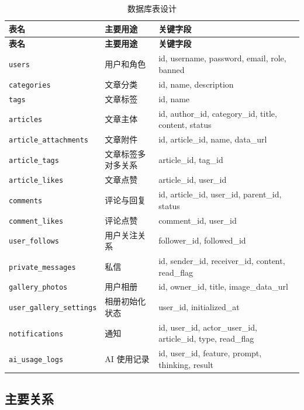 \documentclass[UTF8,a4paper,12pt]{ctexart}
\begin{document}
\begingroup
\small
\setlength{\tabcolsep}{4pt}
\begin{longtable}{p{4.5cm}p{3.1cm}p{6.3cm}}
\caption{数据库表设计}\\
\toprule
\rowcolor{tablehead}\textbf{表名} & \textbf{主要用途} & \textbf{关键字段}\\
\midrule
\endfirsthead
\toprule
\rowcolor{tablehead}\textbf{表名} & \textbf{主要用途} & \textbf{关键字段}\\
\midrule
\endhead
\texttt{users} & 用户和角色 & id, username, password, email, role, banned\\
\texttt{categories} & 文章分类 & id, name, description\\
\texttt{tags} & 文章标签 & id, name\\
\texttt{articles} & 文章主体 & id, author\_id, category\_id, title, content, status\\
\texttt{article\_attachments} & 文章附件 & id, article\_id, name, data\_url\\
\texttt{article\_tags} & 文章标签多对多关系 & article\_id, tag\_id\\
\texttt{article\_likes} & 文章点赞 & article\_id, user\_id\\
\texttt{comments} & 评论与回复 & id, article\_id, user\_id, parent\_id, status\\
\texttt{comment\_likes} & 评论点赞 & comment\_id, user\_id\\
\texttt{user\_follows} & 用户关注关系 & follower\_id, followed\_id\\
\texttt{private\_messages} & 私信 & id, sender\_id, receiver\_id, content, read\_flag\\
\texttt{gallery\_photos} & 用户相册 & id, owner\_id, title, image\_data\_url\\
\texttt{user\_gallery\_settings} & 相册初始化状态 & user\_id, initialized\_at\\
\texttt{notifications} & 通知 & id, user\_id, actor\_user\_id, article\_id, type, read\_flag\\
\texttt{ai\_usage\_logs} & AI 使用记录 & id, user\_id, feature, prompt, thinking, result\\
\bottomrule
\end{longtable}
\endgroup

\subsection{主要关系}
\end{document}
